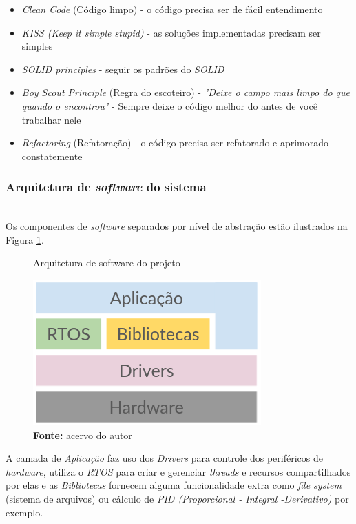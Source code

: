 \documentclass[times, twoside, watermark]{artigo}
\begin{document}
\begin{itemize}
\item \textit{Clean Code} (Código limpo) - o código precisa ser de fácil 
entendimento\cite{martin2009clean}
\item \textit{KISS (Keep it simple stupid)} - as soluções implementadas precisam ser 
simples\cite{martin2018clean}
\item \textit{SOLID principles} - seguir os padrões do \textit{SOLID}
\cite{martin2002agile}
\item \textit{Boy Scout Principle} (Regra do escoteiro) - \textit{"Deixe o campo mais 
limpo do que quando o encontrou"} - Sempre deixe o código melhor do antes de você 
trabalhar nele\cite{martin2009clean}
\item \textit{Refactoring} (Refatoração) - o código precisa ser refatorado e 
aprimorado constatemente\cite{martin2009clean}
\end{itemize}

\subsubsection{Arquitetura de \textit{software} do sistema}\hfill\\
Os componentes de \textit{software} separados por nível de abstração estão ilustrados 
na Figura \ref{fig:arch2}.\hfill\\

\begin{figure}[H]
    \centering
    \caption{Arquitetura de software do projeto}
    \includegraphics[width=0.9\linewidth]{images/arch2.png}
    \caption*{\newline\textbf{Fonte:} acervo do autor}
    \label{fig:arch2}
\end{figure}

A camada de \textit{Aplicação} faz uso dos \textit{Drivers} para controle dos 
periféricos de \textit{hardware}, utiliza o \textit{RTOS} para criar e gerenciar
\textit{threads} e recursos compartilhados por elas e as \textit{Bibliotecas}
fornecem alguma funcionalidade extra como \textit{file system} (sistema de arquivos)
ou cálculo de \textit{PID (Proporcional - Integral -Derivativo)} por exemplo.
\end{document}
